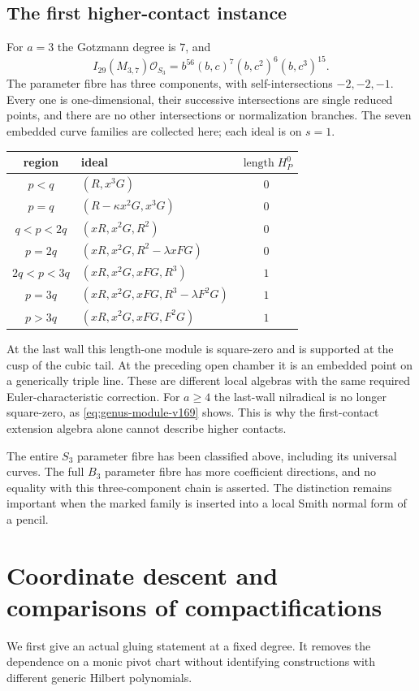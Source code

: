 \documentclass[11pt,reqno]{amsart}
\numberwithin{equation}{section}
\theoremstyle{definition}\newtheorem{definition}[theorem]{Definition}
\theoremstyle{remark}\newtheorem{remark}[theorem]{Remark}
\newcommand{\OO}{\mathcal O}\newcommand{\II}{\mathcal I}
\DeclareMathOperator{\length}{length}
\begin{document}
\subsection{The first higher-contact instance}
For $a=3$ the Gotzmann degree is $7$, and
\begin{equation}\label{eq:cubic-factor-v169}
 I_{29}(M_{3,7})\OO_{S_3}
       =b^{56}(b,c)^7(b,c^2)^6(b,c^3)^{15}.
\end{equation}
The parameter fibre has three components, with self-intersections
$-2,-2,-1$. Every one is one-dimensional, their successive
intersections are single reduced points, and there are no other
intersections or normalization branches. The seven embedded curve
families are collected here; each ideal is on $s=1$.
\begin{center}
\small
\begin{tabular}{c|l|c}
region & ideal & $\length H^0_P$\\ \hline
$p<q$ & $(R,x^3G)$ & $0$\\
$p=q$ & $(R-\kappa x^2G,x^3G)$ & $0$\\
$q<p<2q$ & $(xR,x^2G,R^2)$ & $0$\\
$p=2q$ & $(xR,x^2G,R^2-\lambda xFG)$ & $0$\\
$2q<p<3q$ & $(xR,x^2G,xFG,R^3)$ & $1$\\
$p=3q$ & $(xR,x^2G,xFG,R^3-\lambda F^2G)$ & $1$\\
$p>3q$ & $(xR,x^2G,xFG,F^2G)$ & $1$
\end{tabular}
\end{center}
At the last wall this length-one module is square-zero and is supported
at the cusp of the cubic tail. At the preceding open chamber it is
an embedded point on a generically triple line. These are different
local algebras with the same required Euler-characteristic correction.
For $a\geq4$ the last-wall nilradical is no longer square-zero, as
\eqref{eq:genus-module-v169} shows. This is why the first-contact
extension algebra alone cannot describe higher contacts.

The entire $S_3$ parameter fibre has been classified above, including
its universal curves. The full $B_3$ parameter fibre has more
coefficient directions, and no equality with this three-component
chain is asserted. The distinction remains important when the
marked family is inserted into a local Smith normal form of a pencil.

\section{Coordinate descent and comparisons of compactifications}
\label{sec:equivariant-v169}
We first give an actual gluing statement at a fixed degree. It removes
the dependence on a monic pivot chart without identifying constructions
with different generic Hilbert polynomials.
\end{document}
